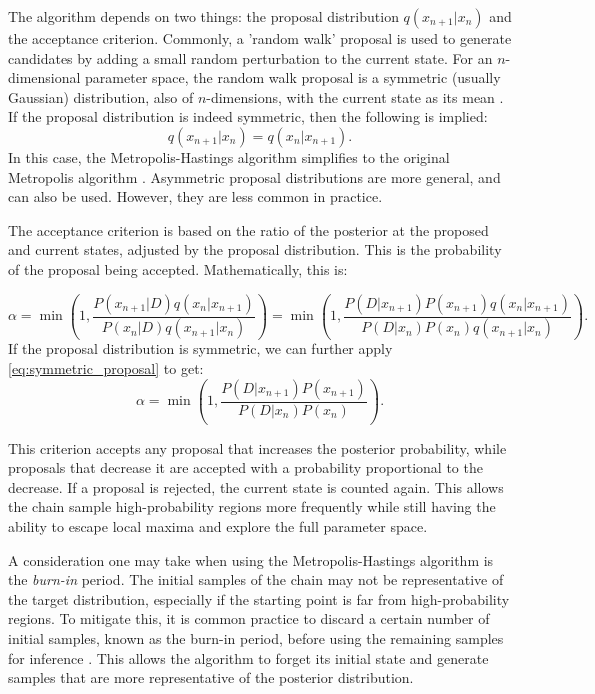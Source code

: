 \documentclass[preprint,longauthor]{aastex631}
\numberwithin{equation}{section}
\begin{document}
The algorithm depends on two things: the proposal distribution $q(x_{n+1}|x_n)$ and the acceptance criterion. Commonly, a 'random walk' proposal is used to generate candidates by adding a small random perturbation to the current state. For an $n$-dimensional parameter space, the random walk proposal is a symmetric (usually Gaussian) distribution, also of $n$-dimensions, with the current state as its mean \citep{vontoussaintBayesianInferencePhysics2011}. If the proposal distribution is indeed symmetric, then the following is implied:
\begin{equation}
  \label{eq:symmetric_proposal}
  q(x_{n+1}|x_n) = q(x_n|x_{n+1}).
\end{equation}
In this case, the Metropolis-Hastings algorithm simplifies to the original Metropolis algorithm \citep{brewer1BayesianInference2018}. Asymmetric proposal distributions are more general, and can also be used. However, they are less common in practice.

The acceptance criterion is based on the ratio of the posterior at the proposed and current states, adjusted by the proposal distribution. This is the probability of the proposal being accepted. Mathematically, this is:

\begin{equation}
  \alpha = \min\left(1, \frac{P(x_{n+1}|D) q(x_n|x_{n+1})}{P(x_n|D) q(x_{n+1}|x_n)}\right) = \min\left(1, \frac{P(D|x_{n+1}) P(x_{n+1}) q(x_n|x_{n+1})}{P(D|x_n) P(x_n) q(x_{n+1}|x_n)}\right).
\end{equation}
If the proposal distribution is symmetric, we can further apply \autoref{eq:symmetric_proposal} to get:
\begin{equation}
  \alpha = \min\left(1, \frac{P(D|x_{n+1}) P(x_{n+1})}{P(D|x_n) P(x_n)}\right).
\end{equation}

This criterion accepts any proposal that increases the posterior probability, while proposals that decrease it are accepted with a probability proportional to the decrease. If a proposal is rejected, the current state is counted again. This allows the chain sample high-probability regions more frequently while still having the ability to escape local maxima and explore the full parameter space.

A consideration one may take when using the Metropolis-Hastings algorithm is the \textit{burn-in} period. The initial samples of the chain may not be representative of the target distribution, especially if the starting point is far from high-probability regions. To mitigate this, it is common practice to discard a certain number of initial samples, known as the burn-in period, before using the remaining samples for inference \citep{vanravenzwaaijSimpleIntroductionMarkov2018}. This allows the algorithm to forget its initial state and generate samples that are more representative of the posterior distribution.
\end{document}
